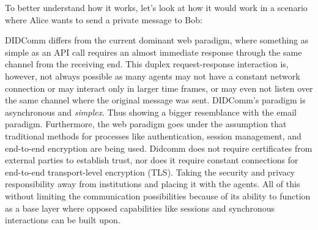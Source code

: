 To better understand how it works, let's look at how it would work in a scenario where Alice wants to send a private message to Bob: 












DIDComm differs from the current dominant web paradigm, where something as simple as an API call requires an almost immediate response through the same channel from the receiving end. This duplex request-response interaction is, however, not always possible as many agents may not have a constant network connection or may interact only in larger time frames, or may even not listen over the same channel where the original message was sent. DIDComm's paradigm is asynchronous and \emph{simplex}. Thus showing a bigger resemblance with the email paradigm. Furthermore, the web paradigm goes under the assumption that traditional methods for processes like authentication, session management, and end-to-end encryption are being used. Didcomm does not require certificates from external parties to establish trust, nor does it require constant connections for end-to-end transport-level encryption (TLS). Taking the security and privacy responsibility away from institutions and placing it with the agents. All of this without limiting the communication possibilities because of its ability to function as a base layer where opposed capabilities like sessions and synchronous interactions can be built upon. \cite{curren_looker_terbu_2020}

